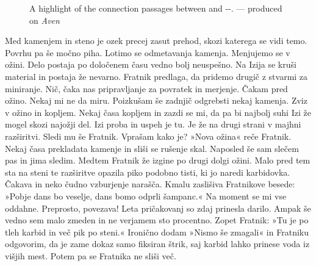 \begin{figure}[t!]
\checkoddpage \ifoddpage \forcerectofloat \else \forceversofloat \fi
\centering
{}
\caption{A highlight of the connection passages between \protect{} and \protect{}-\protect{}-\protect{}. --- produced on \emph{Aven} }
\label{migovec in autumn}
\end{figure}


Med kamenjem in steno je ozek precej zasut prehod, skozi katerega se vidi temo. Povrhu pa še močno piha. Lotimo se odmetavanja kamenja. Menjujemo se v ožini. Delo postaja po določenem času vedno bolj neuspešno. Na Izija se kruši material in postaja že nevarno. Fratnik predlaga, da pridemo drugič z stvarmi za miniranje. Nič, čaka nas pripravljanje za povratek in merjenje. Čakam pred ožino. Nekaj mi ne da miru. Poizkušam še zadnjič odgrebsti nekaj kamenja. Zviz v ožino in kopljem. Nekaj časa kopljem in zazdi se mi, da pa bi najbolj suhi Izi že mogel skozi najožji del. Izi proba in uspeh je tu. Je že na drugi strani v majhni razširitvi. Sledi mu še Fratnik. Vprašam kako je? »Nova ožina« reče Fratnik. Nekaj časa prekladata kamenje in sliši se rušenje skal. Naposled še sam slečem pas in jima sledim. Medtem Fratnik že izgine po drugi dolgi ožini. Malo pred tem sta na steni te razširitve opazila piko podobno tisti, ki jo naredi karbidovka. Čakava in neko čudno vzburjenje narašča. Kmalu zaslišiva Fratnikove besede: »Pobje dans bo veselje, dans bomo odprli šampanc.« Na moment se mi vse oddahne. Preprosto, povezava! Leta pričakovanj so zdaj prinesla darilo. Ampak še vedno sem malo zmeden in ne verjamem sto procentno. Zopet Fratnik: »Tu je po tleh karbid in več pik po steni.«  Ironično dodam »Nismo še zmagali« in Fratniku odgovorim, da je zame dokaz samo fiksiran štrik, saj karbid lahko prinese voda iz višjih mest. Potem pa se Fratnika ne sliši več. 

